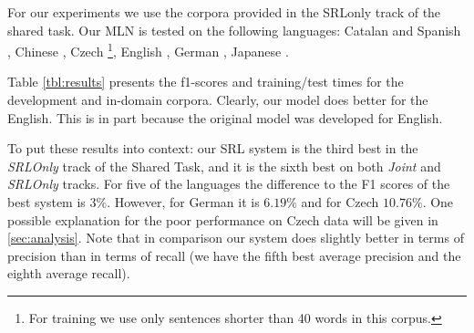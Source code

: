 For our experiments we use the corpora provided in the SRLonly track of the shared task. Our MLN is tested on the following languages: Catalan and Spanish 
\citep{catalan-and-spanish-data} , Chinese \citep{chinese-data}, Czech 
\citep{czech-data}\footnote{For training we use only sentences shorter than 40 
words in this corpus.}, English \citep{english-data}, German 
\citep{german-data}, Japanese \citep{japanese-data}. 

Table \ref{tbl:results} presents the f1-scores and training/test times for the development and
in-domain corpora. Clearly, our model does better for the English. This is in part because the original model was developed for English. 

To put these results into context: our SRL system is the third best in the \emph{SRLOnly} 
track of the Shared Task, and it is the sixth best on both \emph{Joint} 
and \emph{SRLOnly} tracks. For five of the languages the difference to the F1 scores 
of the best system is $3\%$.  However, for 
German it is $6.19\%$ and for Czech $10.76\%$.  One possible explanation for the poor performance on Czech data will be given in \ref{sec:analysis}. Note that in comparison our system does slightly better in terms of precision than in terms of recall (we have the fifth best average precision and the eighth average 
recall).


